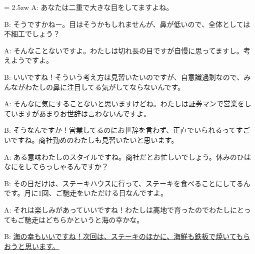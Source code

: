 \documentclass[11pt]{amsart}
\title{}
\author{}
\newenvironment{hangall}[1]{\hangindent = 2.5zw\everypar{\hangindent = 2.5zw}}{}
\begin{document}
\maketitle
\begin{hangall}{}%
A: あなたは二重で大きな目をしてますよね。

B: そうですかねー。目はそうかもしれませんが、鼻が低いので、全体としては不細工でしょう？

A: そんなことないですよ。わたしは切れ長の目ですが自慢に思ってますし。考えようですよ。

B: いいですね！そういう考え方は見習いたいのですが、自意識過剰なので、みんながわたしの鼻に注目してる気がしてならないんです。

A: そんなに気にすることないと思いますけどね。わたしは証券マンで営業をしていますがあまりお世辞は言わないんですよ。

B: そうなんですか！営業してるのにお世辞を言わず、正直でいられるってすごいですね。商社勤めのわたしも見習いたいと思います。

A: ある意味わたしのスタイルですね。商社だとお忙しいでしょう。休みのひはなにをしてらっしゃるんですか？

B: その日だけは、ステーキハウスに行って、ステーキを食べることにしてるんです。月に1回、ご馳走をいただける日なんですよ。

A: それは楽しみがあっていいですね！わたしは高地で育ったのでわたしにとってもご馳走はどちらかというと海の幸かな。

B: \ul{海の幸もいいですね！次回は、ステーキのほかに、海鮮も鉄板で焼いてもらおうと思います。}\end{hangall}
\end{document}
